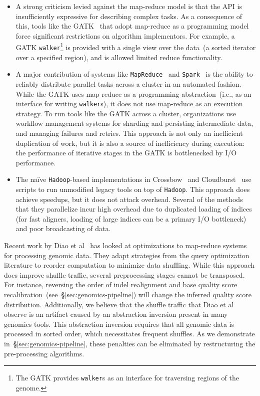 \documentclass[masters]{ucbthesis}
\begin{document}
\begin{itemize}
\item A strong criticism levied against the map-reduce model is that the API is insufficiently expressive
for describing complex tasks. As a consequence of this, tools like the GATK~\cite{mckenna10} that
adopt map-reduce as a programming model force significant restrictions on algorithm implementors. For
example, a GATK \texttt{walker}\footnote{The GATK provides \texttt{walker}s as an interface for
traversing regions of the genome.} is provided with a single view over the data~(a sorted iterator over a
specified region), and is allowed limited reduce functionality.
\item A major contribution of systems like \texttt{MapReduce}~\cite{dean08} and \texttt{Spark}~\cite{zaharia10,
zaharia12} is the ability to reliably distribute parallel tasks across a cluster in an automated fashion. While
the GATK uses map-reduce as a programming abstraction~(i.e., as an interface for writing
\texttt{walker}s), it does not use map-reduce as an execution strategy. To run tools like the GATK across
a cluster, organizations use workflow management systems for sharding and persisting intermediate
data, and managing failures and retries. This approach is not only an inefficient duplication of work, but it
is also a source of inefficiency during execution: the performance of iterative stages in the GATK is
bottlenecked by I/O performance.
\item The na\"{i}ve \texttt{Hadoop}-based implementations in Crossbow~\cite{langmead09} and
Cloudburst~\cite{schatz09} use scripts to run unmodified legacy tools on top of \texttt{Hadoop}. This approach
does achieve speedups, but it does not attack overhead. Several of the methods that they parallelize
incur high overhead due to duplicated loading of indices (for fast aligners, loading of large indices can be
a primary I/O bottleneck) and poor broadcasting of data.
\end{itemize}

Recent work by Diao et al~\cite{diao15} has looked at optimizations to map-reduce systems for
processing genomic data. They adapt strategies from the query optimization literature to reorder
computation to minimize data shuffling. While this approach does improve shuffle traffic, several
preprocessing stages cannot be transposed. For instance, reversing the order of indel realignment and
base quality score recalibration~(see~\S\ref{sec:genomics-pipeline}) will change the inferred quality
score distribution. Additionally, we believe that the shuffle traffic that Diao et al observe is an artifact
caused by an abstraction inversion present in many genomics tools. This abstraction inversion requires
that all genomic data is processed in sorted order, which necessitates frequent shuffles. As we
demonstrate in~\S\ref{sec:genomics-pipeline}, these penalties can be eliminated by restructuring the
pre-processing algorithms.
\end{document}
